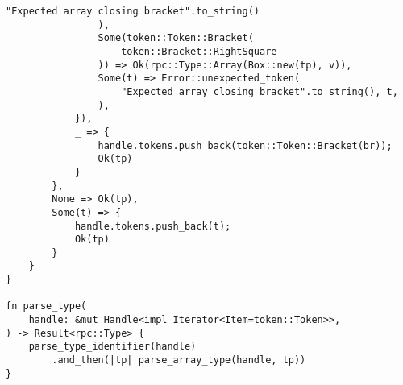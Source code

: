 \begin{lstlisting}[caption={Разбор типа (часть 6)}, label={lst:rust_parser_type6}]
                    "Expected array closing bracket".to_string()
                ),
                Some(token::Token::Bracket(
                    token::Bracket::RightSquare
                )) => Ok(rpc::Type::Array(Box::new(tp), v)),
                Some(t) => Error::unexpected_token(
                    "Expected array closing bracket".to_string(), t,
                ),
            }),
            _ => {
                handle.tokens.push_back(token::Token::Bracket(br));
                Ok(tp)
            }
        },
        None => Ok(tp),
        Some(t) => {
            handle.tokens.push_back(t);
            Ok(tp)
        }
    }
}

fn parse_type(
    handle: &mut Handle<impl Iterator<Item=token::Token>>,
) -> Result<rpc::Type> {
    parse_type_identifier(handle)
        .and_then(|tp| parse_array_type(handle, tp))
}
\end{lstlisting}

